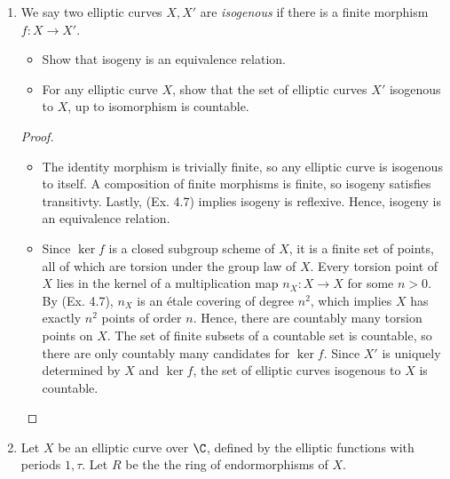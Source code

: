 \documentclass[a4paper]{article}
\begin{document}
\begin{enumerate} [label=\textbf{\arabic*.}, leftmargin=0em]
    \item[\textbf{9.}] We say two elliptic curves $X, X'$ are \textit{isogenous} if there is a finite morphism $f : X \to X'$.

          \begin{itemize}
              \item[(a)] Show that isogeny is an equivalence relation.
              \item[(b)] For any elliptic curve $X$, show that the set of elliptic curves $X'$ isogenous to $X$, up to isomorphism is countable.
          \end{itemize}

          \begin{proof} $ $ \vspace{0pt}
              \begin{itemize} [leftmargin=0cm]
                  \item[(a)] The identity morphism is trivially finite, so any elliptic curve is isogenous to itself.
                        A composition of finite morphisms is finite, so isogeny satisfies transitivty.
                        Lastly, (Ex. 4.7) implies isogeny is reflexive.
                        Hence, isogeny is an equivalence relation.

                  \item[(b)] Since $\ker{f}$ is a closed subgroup scheme of $X$, it is a finite set of points, all of which are torsion under the group law of $X$.
                        Every torsion point of $X$ lies in the kernel of a multiplication map $n_X : X \to X$ for some $n > 0$.
                        By (Ex. 4.7), $n_X$ is an étale covering of degree $n^2$, which implies $X$ has exactly $n^2$ points of order $n$.
                        Hence, there are countably many torsion points on $X$.
                        The set of finite subsets of a countable set is countable, so there are only countably many candidates for $\ker{f}$.
                        Since $X'$ is uniquely determined by $X$ and $\ker{f}$, the set of elliptic curves isogenous to $X$ is countable.
              \end{itemize}
          \end{proof}

    \item[\textbf{11.}] Let $X$ be an elliptic curve over $\C$, defined by the elliptic functions with periods $1, \tau$.
          Let $R$ be the the ring of endormorphisms of $X$.


\end{enumerate}
\end{document}
